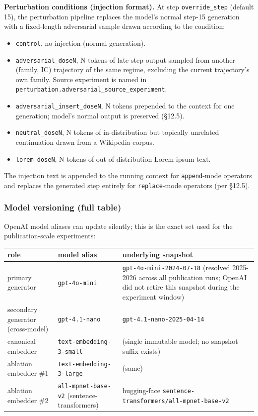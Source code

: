 \documentclass{article}
\theoremstyle{plain}
\theoremstyle{definition}
\begin{document}
\textbf{Perturbation conditions (injection format).} At step \texttt{override\_step}
(default 15), the perturbation pipeline replaces the model's normal
step-15 generation with a fixed-length adversarial sample drawn
according to the condition:

\begin{itemize}
  \item \texttt{control}, no injection (normal generation).
  \item \texttt{adversarial\_doseN}, N tokens of late-step output sampled from
  another (family, IC) trajectory of the same regime, excluding the
  current trajectory's own family. Source experiment is named in
  \texttt{perturbation.adversarial\_source\_experiment}.
  \item \texttt{adversarial\_insert\_doseN}, N tokens prepended to the context for
  one generation; model's normal output is preserved (§12.5).
  \item \texttt{neutral\_doseN}, N tokens of in-distribution but topically
  unrelated continuation drawn from a Wikipedia corpus.
  \item \texttt{lorem\_doseN}, N tokens of out-of-distribution Lorem-ipsum text.
\end{itemize}

The injection text is appended to the running context for \texttt{append}-mode
operators and replaces the generated step entirely for \texttt{replace}-mode
operators (per §12.5).

\subsubsection*{Model versioning (full table)}

OpenAI model aliases can update silently; this is the exact set used
for the publication-scale experiments:

\begin{table}[h!]
\centering
\small
\begin{tabularx}{\textwidth}{lYY}
\toprule
role & model alias & underlying snapshot \\
\midrule
primary generator & \texttt{gpt-4o-mini} & \texttt{gpt-4o-mini-2024-07-18} (resolved 2025-2026 across all publication runs; OpenAI did not retire this snapshot during the experiment window) \\
secondary generator (cross-model) & \texttt{gpt-4.1-nano} & \texttt{gpt-4.1-nano-2025-04-14} \\
canonical embedder & \texttt{text-embedding-3-small} & (single immutable model; no snapshot suffix exists) \\
ablation embedder \#1 & \texttt{text-embedding-3-large} & (same) \\
ablation embedder \#2 & \texttt{all-mpnet-base-v2} (sentence-transformers) & hugging-face \texttt{sentence-transformers/all-mpnet-base-v2} \\
\bottomrule
\end{tabularx}
\end{table}
\end{document}

